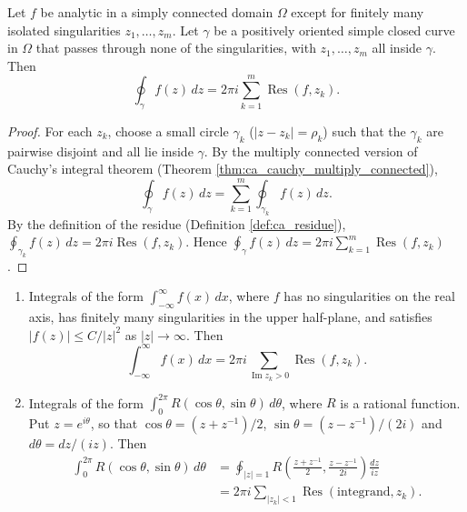 \begin{theorem}\label{thm:ca_residue_theorem}
Let $f$ be analytic in a simply connected domain $\Omega$ except for finitely many isolated singularities $z_1, \dots, z_m$. Let $\gamma$ be a positively oriented simple closed curve in $\Omega$ that passes through none of the singularities, with $z_1, \dots, z_m$ all inside $\gamma$. Then
\[
\oint_\gamma f(z) \, dz = 2\pi i \sum_{k=1}^{m} \operatorname{Res}(f, z_k).
\]
\end{theorem}

\begin{proof}
For each $z_k$, choose a small circle $\gamma_k$ ($|z - z_k| = \rho_k$) such that the $\gamma_k$ are pairwise disjoint and all lie inside $\gamma$. By the multiply connected version of Cauchy's integral theorem (Theorem \ref{thm:ca_cauchy_multiply_connected}),
\[
\oint_\gamma f(z) \, dz = \sum_{k=1}^{m} \oint_{\gamma_k} f(z) \, dz.
\]
By the definition of the residue (Definition \ref{def:ca_residue}), $\oint_{\gamma_k} f(z) \, dz = 2\pi i \operatorname{Res}(f, z_k)$. Hence $\oint_\gamma f(z) \, dz = 2\pi i \sum_{k=1}^{m} \operatorname{Res}(f, z_k)$.
\end{proof}

\begin{corollary}\label{cor:ca_residue_real_integral}
\begin{enumerate}[label=(\roman*)]
    \item Integrals of the form $\int_{-\infty}^{\infty} f(x) \, dx$, where $f$ has no singularities on the real axis, has finitely many singularities in the upper half-plane, and satisfies $|f(z)| \le C/|z|^2$ as $|z| \to \infty$. Then
    \[
    \int_{-\infty}^{\infty} f(x) \, dx = 2\pi i \sum_{\operatorname{Im} z_k > 0} \operatorname{Res}(f, z_k).
    \]
    \item Integrals of the form $\int_0^{2\pi} R(\cos\theta, \sin\theta) \, d\theta$, where $R$ is a rational function. Put $z = e^{i\theta}$, so that $\cos\theta = (z + z^{-1})/2$, $\sin\theta = (z - z^{-1})/(2i)$ and $d\theta = dz/(iz)$. Then
    \[
    \begin{aligned}
    \int_0^{2\pi} R(\cos\theta, \sin\theta) \, d\theta
      &= \oint_{|z| = 1} R\left( \frac{z + z^{-1}}{2}, \frac{z - z^{-1}}{2i} \right) \frac{dz}{iz}\\
      &= 2\pi i \sum_{|z_k| < 1} \operatorname{Res}(\text{integrand}, z_k).
    \end{aligned}
    \]
\end{enumerate}
\end{corollary}

